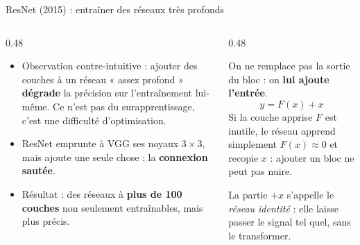 \begin{frame}{ResNet (2015) : entraîner des réseaux très profonds}
\begin{columns}[t]
\begin{column}{0.48\textwidth}
\begin{itemize}
  \item Observation contre-intuitive : ajouter des couches à un réseau
  « assez profond » \textbf{dégrade} la précision sur l'entraînement
  lui-même. Ce n'est pas du surapprentissage, c'est une difficulté
  d'optimisation.
  \item ResNet emprunte à VGG ses noyaux $3\times3$, mais ajoute une seule
  chose : la \textbf{connexion sautée}.
  \item Résultat : des réseaux à \textbf{plus de 100 couches} non seulement
  entraînables, mais plus précis.
\end{itemize}
\end{column}
\begin{column}{0.48\textwidth}
\begin{kbox}
On ne remplace pas la sortie du bloc : on \textbf{lui ajoute l'entrée}.
\[
  y = F(x) + x
\]
Si la couche apprise $F$ est inutile, le réseau apprend simplement
$F(x)\approx 0$ et recopie $x$ : ajouter un bloc ne peut pas nuire.
\end{kbox}
\begin{ebox}
La partie $+x$ s'appelle le \emph{réseau identité} : elle laisse passer
le signal tel quel, sans le transformer.
\end{ebox}
\end{column}
\end{columns}
\end{frame}

